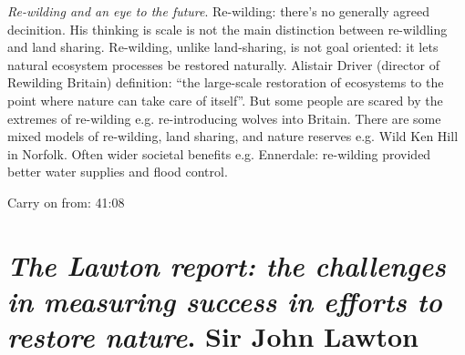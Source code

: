 \documentclass[9pt]{article}
\begin{document}
	\textit{Re-wilding and an eye to the future}. Re-wilding: there’s no generally agreed decinition. His thinking is scale is not the main distinction between re-wildling and land sharing. Re-wilding, unlike land-sharing, is not goal oriented: it lets natural ecosystem processes be restored naturally. Alistair Driver (director of Rewilding Britain) definition: “the large-scale restoration of ecosystems to the point where nature can take care of itself”. But some people are scared by the extremes of re-wilding e.g. re-introducing wolves into Britain. There are some mixed models of re-wilding, land sharing, and nature reserves e.g. Wild Ken Hill in Norfolk. Often wider societal benefits e.g. Ennerdale: re-wilding provided better water supplies and flood control. 
	
	Carry on from: 41:08
	
	
	\section{\textit{The Lawton report: the challenges in measuring success in efforts to restore nature}. Sir John Lawton}
	
	
	
	



	
	
	
	
	
	
	
\end{document}
